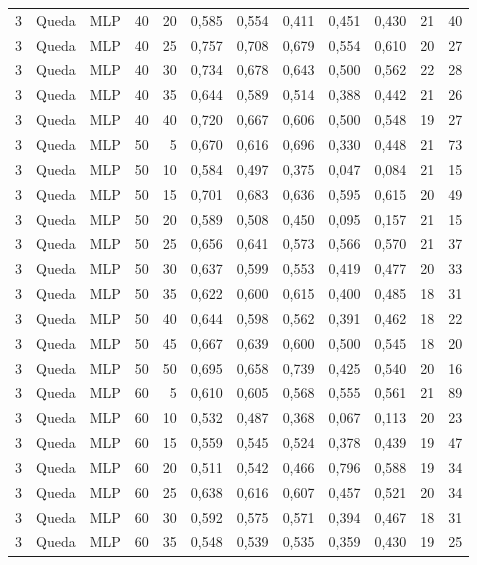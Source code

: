 \begin{longtable}{@{}rllrrrrrrrrr@{}}
3 & Queda & MLP & 40 & 20 & 0,585 & 0,554 & 0,411 & 0,451 & 0,430 & 21 & 40 \\
3 & Queda & MLP & 40 & 25 & 0,757 & 0,708 & 0,679 & 0,554 & 0,610 & 20 & 27 \\
3 & Queda & MLP & 40 & 30 & 0,734 & 0,678 & 0,643 & 0,500 & 0,562 & 22 & 28 \\
3 & Queda & MLP & 40 & 35 & 0,644 & 0,589 & 0,514 & 0,388 & 0,442 & 21 & 26 \\
3 & Queda & MLP & 40 & 40 & 0,720 & 0,667 & 0,606 & 0,500 & 0,548 & 19 & 27 \\
3 & Queda & MLP & 50 & 5 & 0,670 & 0,616 & 0,696 & 0,330 & 0,448 & 21 & 73 \\
3 & Queda & MLP & 50 & 10 & 0,584 & 0,497 & 0,375 & 0,047 & 0,084 & 21 & 15 \\
3 & Queda & MLP & 50 & 15 & 0,701 & 0,683 & 0,636 & 0,595 & 0,615 & 20 & 49 \\
3 & Queda & MLP & 50 & 20 & 0,589 & 0,508 & 0,450 & 0,095 & 0,157 & 21 & 15 \\
3 & Queda & MLP & 50 & 25 & 0,656 & 0,641 & 0,573 & 0,566 & 0,570 & 21 & 37 \\
3 & Queda & MLP & 50 & 30 & 0,637 & 0,599 & 0,553 & 0,419 & 0,477 & 20 & 33 \\
3 & Queda & MLP & 50 & 35 & 0,622 & 0,600 & 0,615 & 0,400 & 0,485 & 18 & 31 \\
3 & Queda & MLP & 50 & 40 & 0,644 & 0,598 & 0,562 & 0,391 & 0,462 & 18 & 22 \\
3 & Queda & MLP & 50 & 45 & 0,667 & 0,639 & 0,600 & 0,500 & 0,545 & 18 & 20 \\
3 & Queda & MLP & 50 & 50 & 0,695 & 0,658 & 0,739 & 0,425 & 0,540 & 20 & 16 \\
3 & Queda & MLP & 60 & 5 & 0,610 & 0,605 & 0,568 & 0,555 & 0,561 & 21 & 89 \\
3 & Queda & MLP & 60 & 10 & 0,532 & 0,487 & 0,368 & 0,067 & 0,113 & 20 & 23 \\
3 & Queda & MLP & 60 & 15 & 0,559 & 0,545 & 0,524 & 0,378 & 0,439 & 19 & 47 \\
3 & Queda & MLP & 60 & 20 & 0,511 & 0,542 & 0,466 & 0,796 & 0,588 & 19 & 34 \\
3 & Queda & MLP & 60 & 25 & 0,638 & 0,616 & 0,607 & 0,457 & 0,521 & 20 & 34 \\
3 & Queda & MLP & 60 & 30 & 0,592 & 0,575 & 0,571 & 0,394 & 0,467 & 18 & 31 \\
3 & Queda & MLP & 60 & 35 & 0,548 & 0,539 & 0,535 & 0,359 & 0,430 & 19 & 25 \\

\end{longtable}
